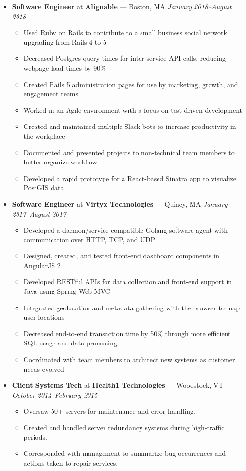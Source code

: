 \documentclass{article}
\begin{document}
\begin{itemize}[label={},leftmargin=*]

\item \textbf{Software Engineer} at \textbf{Alignable} --- Boston, MA \hfill {\em January 2018--August 2018}
  \begin{itemize}[label={$\bullet$}]
  \item Used Ruby on Rails to contribute to a small business social network, upgrading from Rails 4 to 5
  \item Decreased Postgres query times for inter-service API calls, reducing webpage load times by 90\%
  \item Created Rails 5 administration pages for use by marketing, growth, and engagement teams
  \item Worked in an Agile environment with a focus on test-driven development
  \item Created and maintained multiple Slack bots to increase productivity in the workplace
  \item Documented and presented projects to non-technical team members to better organize workflow
  \item Developed a rapid prototype for a React-based Sinatra app to visualize PostGIS data
  \end{itemize}

\item \textbf{Software Engineer} at \textbf{Virtyx Technologies} --- Quincy, MA \hfill {\em January 2017--August 2017}
  \begin{itemize}[label={$\bullet$}]
  \item Developed a daemon/service-compatible Golang software agent with communication over HTTP, TCP, and UDP
  \item Designed, created, and tested front-end dashboard components in AngularJS 2
  \item Developed RESTful APIs for data collection and front-end support in Java using Spring Web MVC
  \item Integrated geolocation and metadata gathering with the browser to map user locations
  \item Decreased end-to-end transaction time by 50\% through more efficient SQL usage and data processing
  \item Coordinated with team members to architect new systems as customer needs evolved
  \end{itemize}

\item \textbf{Client Systems Tech} at \textbf{Health1 Technologies} --- Woodstock, VT \hfill {\em October 2014--February 2015}
  \begin{itemize}[label={$\bullet$}]
  \item Oversaw 50+ servers for maintenance and error-handling.
  \item Created and handled server redundancy systems during high-traffic periods.
  \item Corresponded with management to summarize bug occurrences and actions taken to repair services.
  \end{itemize}


\end{itemize}
\end{document}
